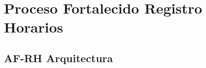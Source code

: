 \chapter{Proceso Fortalecido Registro Horarios}
\hypertarget{chapter:PFRH}{}
\section{AF-RH Arquitectura}
%	


